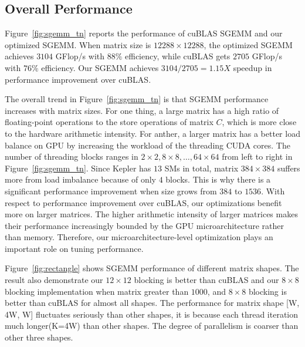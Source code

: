 \subsection{Overall Performance}
Figure~\ref{fig:sgemm_tn} reports the performance of cuBLAS SGEMM and our optimized SGEMM.
When matrix size is $12288\times12288$, the optimized SGEMM achieves $3104$
GFlop/s with $88\%$ efficiency, while cuBLAS gets $2705$ GFlop/s with $76\%$ efficiency.
Our SGEMM achieves $3104/2705=1.15X$ speedup in performance improvement over cuBLAS.%

The overall trend in Figure~\ref{fig:sgemm_tn} is that SGEMM performance increases with matrix sizes. 
For one thing, a large matrix has a high ratio of 
floating-point operations to the store operations of matrix $C$, which is more close to the hardware arithmetic intensity. 
For anther, a larger matrix has a better load balance on GPU by increasing the workload of the threading CUDA
cores.
The number of threading blocks ranges in $2 \times 2, 8 \times 8, \dots, 64 \times 64$ from left to right in Figure~\ref{fig:sgemm_tn}.
Since Kepler has $13$ SMs in total, matrix $384\times 384$ suffers more from load imbalance because of only $4$ blocks.
This is why there is a significant performance improvement when size grows from $384$ to $1536$. 
With respect to performance improvement over cuBLAS, our optimizations benefit more on larger matrices. 
The higher arithmetic intensity of larger matrices makes their performance increasingly bounded by the GPU microarchitecture rather than memory. 
Therefore, our microarchitecture-level optimization plays an important role on tuning 
performance.

Figure~\ref{fig:rectangle} shows SGEMM performance of different matrix shapes.
The result also demonstrate our $12\times12$ blocking is better than cuBLAS and
our $8\times8$ blocking implementation when matrix greater than $1000$,  and
$8\times8$ blocking is better than cuBLAS for almost all shapes. The performance for matrix shape [W, 4W,
W] fluctuates seriously than other shapes, it is because each thread iteration
much longer(K=4W) than other shapes. The degree of parallelism is coarser than other
three shapes.

